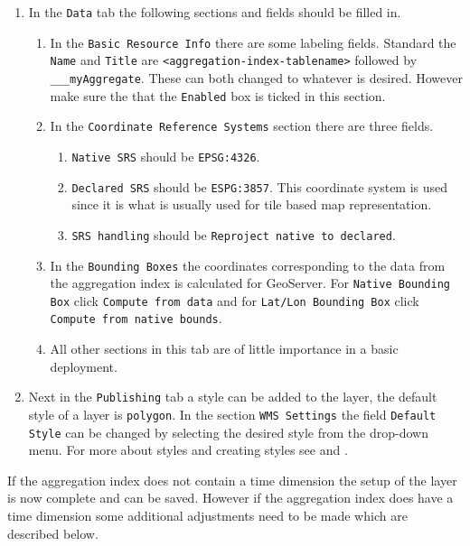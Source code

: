 \begin{enumerate}[resume]
	\item In the \lstinline|Data| tab the following sections and fields should be filled in.
	\begin{enumerate}
		\item In the \lstinline|Basic Resource Info| there are some labeling fields. Standard the \lstinline|Name| and \lstinline|Title| are \lstinline|<aggregation-index-tablename>| followed by \lstinline|___myAggregate|. These can both changed to whatever is desired. However make sure the that the \lstinline|Enabled| box is ticked in this section.
		\item In the \lstinline|Coordinate Reference Systems| section there are three fields.
			\begin{enumerate}
				\item \lstinline|Native SRS| should be \lstinline|EPSG:4326|.
				\item \lstinline|Declared SRS| should be \lstinline|ESPG:3857|. This coordinate system is used since it is what is usually used for tile based map representation.
				\item \lstinline|SRS handling| should be \lstinline|Reproject native to declared|.
			\end{enumerate}
		\item In the \lstinline|Bounding Boxes| the coordinates corresponding to the data from the aggregation index is calculated for GeoServer. For \lstinline|Native Bounding Box| click \lstinline|Compute from data| and for \lstinline|Lat/Lon Bounding Box| click \lstinline|Compute from native bounds|.
		\item All other sections in this tab are of little importance in a basic deployment.
	\end{enumerate}
	\item Next in the \lstinline|Publishing| tab a style can be added to the layer, the default style of a layer is \lstinline|polygon|. In the section \lstinline|WMS Settings| the field \lstinline|Default| \lstinline|Style| can be changed by selecting the desired style from the drop-down menu. For more about styles and creating styles see  and .
\end{enumerate}

\noindent If the aggregation index does not contain a time dimension the
setup of the layer is now complete and can be saved. However if the
aggregation index does have a time dimension some additional adjustments
need to be made which are described below.

